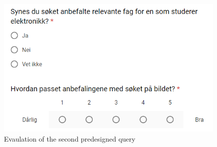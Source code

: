 \begin{figure}[h]
    \centering
    \includegraphics[width=1\textwidth]{fig/form2/s7_4.PNG}
    \caption[]{Evaulation of the second predesigned query}
    \label{fig:questionnaire_2_questions_p10}
\end{figure}